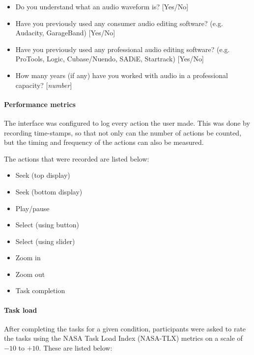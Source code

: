 {\singlespacing
\begin{itemize}
  \item Do you understand what an audio waveform is? [Yes/No]
  \item Have you previously used any consumer audio editing software? (e.g.
    Audacity, GarageBand) [Yes/No]
  \item Have you previously used any professional audio editing software? (e.g.
    ProTools, Logic, Cubase/Nuendo, SADiE, Startrack) [Yes/No]
  \item How many years (if any) have you worked with audio in a professional
    capacity? [\textit{number}]
\end{itemize}
}

\paragraph{Performance metrics}
The interface was configured to log every action the user made. This was done
by recording time-stamps, so that not only can the number of actions be counted,
but the timing and frequency of the actions can also be measured.

The actions that were recorded are listed below:

{\singlespacing
\begin{itemize}
  \item Seek (top display)
  \item Seek (bottom display)
  \item Play/pause
  \item Select (using button)
  \item Select (using slider)
  \item Zoom in
  \item Zoom out
  \item Task completion
\end{itemize}
}

\paragraph{Task load}
After completing the tasks for a given condition, participants were asked to
rate the tasks using the NASA Task Load Index (NASA-TLX) \citep{Hart1988}
metrics on a scale of $-10$ to $+10$. These are listed below:

